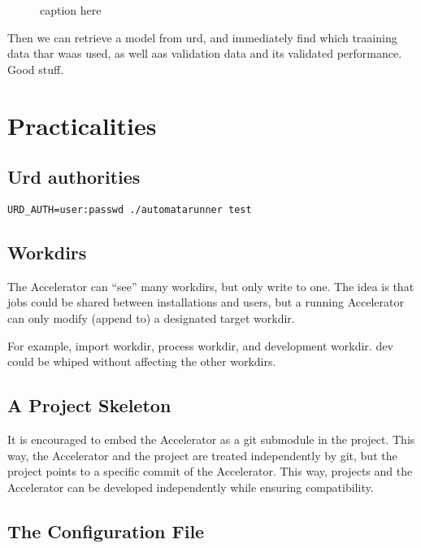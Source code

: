 \documentclass[a4paper]{article}
\begin{document}
\begin{figure}[h!]
  \begin{center}
    
    \caption{caption here}
    \label{}
  \end{center}
\end{figure}


\clearpage
\appendix



Then we can retrieve a model from urd, and immediately find which traaining data thar waas used,
as well aas validation data and its validated performance.  Good stuff.


\section{Practicalities}

\subsection{Urd authorities}
\begin{verbatim}
URD_AUTH=user:passwd ./automatarunner test
\end{verbatim}

\subsection{Workdirs}
The Accelerator can ``see'' many workdirs, but only write to one.  The
idea is that jobs could be shared between installations and users, but
a running Accelerator can only modify (append to) a designated target
workdir.

For example, import workdir, process workdir, and development workdir.
dev could be whiped without affecting the other workdirs.


\subsection{A Project Skeleton}
It is encouraged to embed the Accelerator as a git submodule in the
project.  This way, the Accelerator and the project are treated
independently by git, but the project points to a specific commit of
the Accelerator.  This way, projects and the Accelerator can be
developed independently while ensuring compatibility.

\subsection{The Configuration File}
\end{document}
